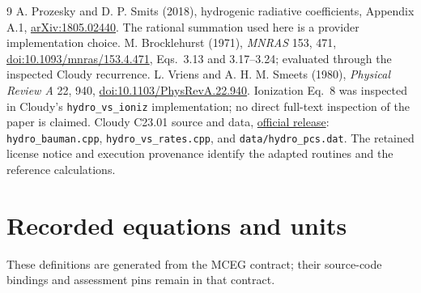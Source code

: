 \documentclass[10pt,a4paper]{article}
\begin{document}
\begin{thebibliography}{9}
 A. Prozesky and D. P. Smits (2018), hydrogenic radiative
coefficients, Appendix A.1, \href{https://arxiv.org/html/1805.02440v1}{arXiv:1805.02440}.
The rational summation used here is a provider implementation choice.
 M. Brocklehurst (1971), \emph{MNRAS} 153, 471,
\href{https://doi.org/10.1093/mnras/153.4.471}{doi:10.1093/mnras/153.4.471},
Eqs.~3.13 and 3.17--3.24; evaluated through the inspected Cloudy recurrence.
 L. Vriens and A. H. M. Smeets (1980), \emph{Physical Review A}
22, 940, \href{https://doi.org/10.1103/PhysRevA.22.940}{doi:10.1103/PhysRevA.22.940}.
Ionization Eq.~8 was inspected in Cloudy's \texttt{hydro\_vs\_ioniz}
implementation; no direct full-text inspection of the paper is claimed.
 Cloudy C23.01 source and data,
\href{https://data.nublado.org/cloudy_releases/c23/c23.01.tar.gz}{official release}:
\texttt{hydro\_bauman.cpp}, \texttt{hydro\_vs\_rates.cpp}, and
\texttt{data/hydro\_pcs.dat}. The retained license notice and execution
provenance identify the adapted routines and the reference calculations.
\end{thebibliography}

\clearpage
\appendix
\section{Recorded equations and units}
\small
These definitions are generated from the MCEG contract; their source-code
bindings and assessment pins remain in that contract.

\end{document}
